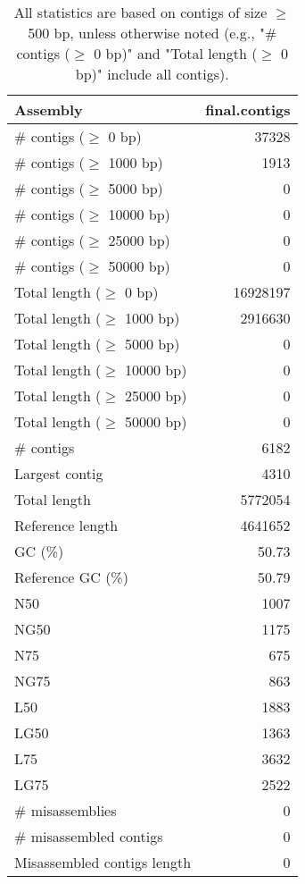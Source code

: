 \documentclass[12pt,a4paper]{article}
\begin{document}
\begin{table}[ht]
\begin{center}
\caption{All statistics are based on contigs of size $\geq$ 500 bp, unless otherwise noted (e.g., "\# contigs ($\geq$ 0 bp)" and "Total length ($\geq$ 0 bp)" include all contigs).}
\begin{tabular}{|l*{1}{|r}|}
\hline
Assembly & final.contigs \\ \hline
\# contigs ($\geq$ 0 bp) & 37328 \\ \hline
\# contigs ($\geq$ 1000 bp) & 1913 \\ \hline
\# contigs ($\geq$ 5000 bp) & 0 \\ \hline
\# contigs ($\geq$ 10000 bp) & 0 \\ \hline
\# contigs ($\geq$ 25000 bp) & 0 \\ \hline
\# contigs ($\geq$ 50000 bp) & 0 \\ \hline
Total length ($\geq$ 0 bp) & 16928197 \\ \hline
Total length ($\geq$ 1000 bp) & 2916630 \\ \hline
Total length ($\geq$ 5000 bp) & 0 \\ \hline
Total length ($\geq$ 10000 bp) & 0 \\ \hline
Total length ($\geq$ 25000 bp) & 0 \\ \hline
Total length ($\geq$ 50000 bp) & 0 \\ \hline
\# contigs & 6182 \\ \hline
Largest contig & 4310 \\ \hline
Total length & 5772054 \\ \hline
Reference length & 4641652 \\ \hline
GC (\%) & 50.73 \\ \hline
Reference GC (\%) & 50.79 \\ \hline
N50 & 1007 \\ \hline
NG50 & 1175 \\ \hline
N75 & 675 \\ \hline
NG75 & 863 \\ \hline
L50 & 1883 \\ \hline
LG50 & 1363 \\ \hline
L75 & 3632 \\ \hline
LG75 & 2522 \\ \hline
\# misassemblies & 0 \\ \hline
\# misassembled contigs & 0 \\ \hline
Misassembled contigs length & 0 \\ \hline

\end{tabular}
\end{center}
\end{table}
\end{document}
